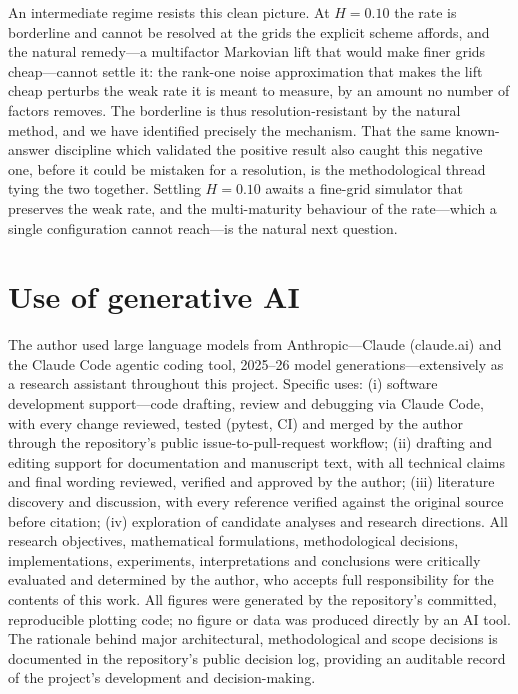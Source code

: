 \documentclass[11pt]{article}
\theoremstyle{plain}
\theoremstyle{definition}
\begin{document}
An intermediate regime resists this clean picture. At $H=0.10$ the rate is borderline and
cannot be resolved at the grids the explicit scheme affords, and the natural remedy---a
multifactor Markovian lift that would make finer grids cheap---cannot settle it: the
rank-one noise approximation that makes the lift cheap perturbs the weak rate it is meant to
measure, by an amount no number of factors removes. The borderline is thus resolution-resistant
by the natural method, and we have identified precisely the mechanism. That the same
known-answer discipline which validated the positive result also caught this negative one,
before it could be mistaken for a resolution, is the methodological thread tying the two
together. Settling $H=0.10$ awaits a fine-grid simulator that preserves the weak rate, and the
multi-maturity behaviour of the rate---which a single configuration cannot reach---is the
natural next question.

\section*{Use of generative AI}

The author used large language models from Anthropic---Claude (claude.ai) and the Claude
Code agentic coding tool, 2025--26 model generations---extensively as a research assistant
throughout this project. Specific uses: (i) software development support---code drafting,
review and debugging via Claude Code, with every change reviewed, tested (pytest, CI) and
merged by the author through the repository's public issue-to-pull-request workflow;
(ii) drafting and editing support for documentation and manuscript text, with all technical
claims and final wording reviewed, verified and approved by the author; (iii) literature
discovery and discussion, with every reference verified against the original source before
citation; (iv) exploration of candidate analyses and research directions. All research
objectives, mathematical formulations, methodological decisions, implementations,
experiments, interpretations and conclusions were critically evaluated and determined by
the author, who accepts full responsibility for the contents of this work. All figures
were generated by the repository's committed, reproducible plotting code; no figure or
data was produced directly by an AI tool. The rationale behind major architectural,
methodological and scope decisions is documented in the repository's public decision log,
providing an auditable record of the project's development and decision-making.
\end{document}
